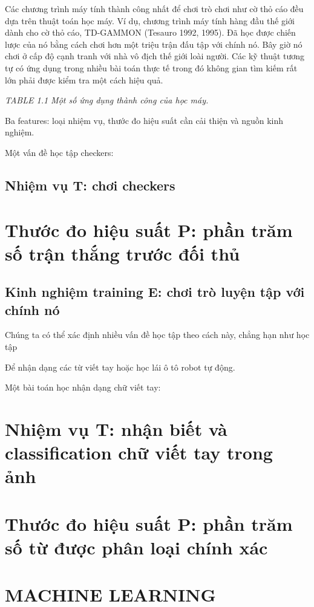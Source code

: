 Các chương trình máy tính thành công nhất để chơi trò chơi như cờ thỏ cáo đều dựa trên thuật toán học máy. Ví dụ, chương trình máy tính hàng đầu thế giới dành cho cờ thỏ cáo, TD-GAMMON (Tesauro 1992, 1995). Đã học được chiến lược của nó bằng cách chơi hơn một triệu trận đấu tập với chính nó. Bây giờ nó chơi ở cấp độ cạnh tranh với nhà vô địch thế giới loài người. Các kỹ thuật tương tự có ứng dụng trong nhiều bài toán thực tế trong đó không gian tìm kiếm rất lớn phải được kiểm tra một cách hiệu quả.

\noindent\textit{TABLE 1.1 Một số ứng dụng thành công của học máy.}

Ba features: loại nhiệm vụ, thước đo hiệu suất cần cải thiện và nguồn kinh nghiệm.

Một vấn đề học tập checkers:

\subsection{Nhiệm vụ T: chơi checkers}

\section{Thước đo hiệu suất P: phần trăm số trận thắng trước đối thủ}

\subsection{Kinh nghiệm training E: chơi trò luyện tập với chính nó}

Chúng ta có thể xác định nhiều vấn đề học tập theo cách này, chẳng hạn như học tập

Để nhận dạng các từ viết tay hoặc học lái ô tô robot tự động.

Một bài toán học nhận dạng chữ viết tay:

\section{Nhiệm vụ T: nhận biết và classification chữ viết tay trong ảnh}

\section{Thước đo hiệu suất P: phần trăm số từ được phân loại chính xác}

\section{MACHINE LEARNING}

